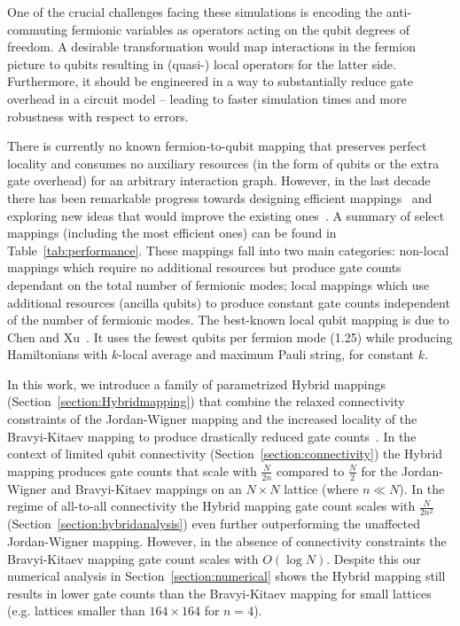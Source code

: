 \documentclass[pdftex,pra,aps,twocolumn,twoside]{revtex4-2}
\theoremstyle{plain}
\theoremstyle{note}
\newcommand\+{{\footnotesize \raisebox{0.3ex}{+}}}
\begin{document}
 One of the crucial challenges facing these simulations is encoding the anti-commuting fermionic variables as operators acting on the qubit degrees of freedom. A desirable transformation would map interactions in the fermion picture to qubits resulting in (quasi-) local operators for the latter side. Furthermore, it should be engineered in a way to substantially reduce gate overhead in a circuit model -- leading to faster simulation times and more robustness with respect to errors.

There is currently no known fermion-to-qubit mapping that preserves perfect locality and consumes no auxiliary resources (in the form of qubits or the extra gate overhead) for an arbitrary interaction graph. However, in the last decade there has been remarkable progress towards designing efficient mappings~\cite{setia2019superfast,havlivcek2017operator,bravyi2002fermionic,seeley2012bravyi, derby2021compact,chen2022equivalence, steudtner2019quantum} and exploring new ideas that would improve the existing ones~\cite{chiew2021optimal}. A summary of select mappings (including the most efficient ones) can be found in Table~\ref{tab:performance}. These mappings fall into two main categories: non-local mappings which require no additional resources but produce gate counts dependant on the total number of fermionic modes; local mappings which use additional resources (ancilla qubits) to produce constant gate counts independent of the number of fermionic modes. The best-known local qubit mapping is due to Chen and Xu~\cite{chen2022equivalence}. It uses the fewest qubits per fermion mode (1.25) while producing Hamiltonians with $k$-local average and maximum Pauli string, for constant $k$. 

In this work, we introduce a family of parametrized Hybrid mappings (Section~\ref{section:Hybridmapping}) that combine the relaxed connectivity constraints of the Jordan-Wigner mapping and the increased locality of the Bravyi-Kitaev mapping to produce drastically reduced gate counts~\cite{tranter2018comparison}. In the context of limited qubit connectivity (Section~\ref{section:connectivity}) the Hybrid mapping produces gate counts that scale with $\frac{N}{2n}$ compared to $\frac{N}{2}$ for the Jordan-Wigner and Bravyi-Kitaev mappings on an $N\times N$ lattice (where $n \ll N$). In the regime of all-to-all connectivity the Hybrid mapping gate count scales with $\frac{N}{2n^2}$ (Section~\ref{section:hybridanalysis}) even further outperforming the unaffected Jordan-Wigner mapping. However, in the absence of connectivity constraints the Bravyi-Kitaev mapping gate count scales with $O(\log N)$. Despite this our numerical analysis in Section~\ref{section:numerical} shows the Hybrid mapping still results in lower gate counts than the Bravyi-Kitaev mapping for small lattices (e.g. lattices smaller than $164 \times 164$ for $n=4$).
\end{document}
